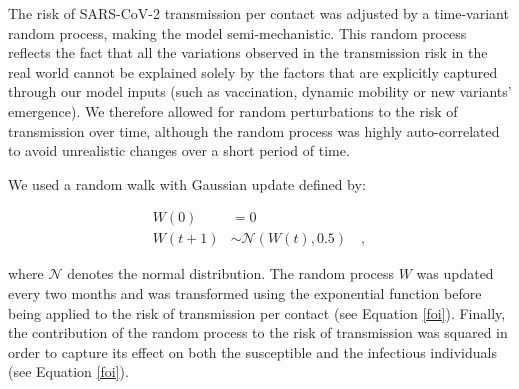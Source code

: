 The risk of SARS-CoV-2 transmission per contact was adjusted by a time-variant random process, making
the model semi-mechanistic. This random process reflects the fact that all the variations observed in the transmission
risk in the real world cannot be explained solely by the factors that are explicitly captured through our model inputs (such as vaccination, dynamic mobility or new variants' emergence).
We therefore allowed for random perturbations to the risk of transmission over time, although the random process was highly auto-correlated
to avoid unrealistic changes over a short period of time.

We used a random walk with Gaussian update defined by:

\begin{equation}
    \label{eq:random_process}
    \begin{split}
    W(0) & = 0 \\
    W(t+1) & \sim \mathcal{N}(W(t), 0.5) \quad ,
    \end{split}
\end{equation}

where $\mathcal{N}$ denotes the normal distribution.
The random process $W$ was updated every two months and was transformed using the exponential function before being applied to the risk of transmission per contact (see Equation \ref{foi}).
Finally, the contribution of the random process to the risk of transmission was squared in order to capture its effect
on both the susceptible and the infectious individuals (see Equation \ref{foi}). 